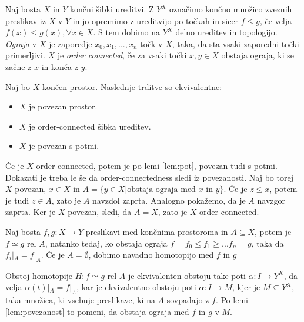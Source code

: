 \documentclass[mat1]{fmfdelo}
\begin{document}
Naj bosta $X$ in $Y$ končni šibki ureditvi. Z $Y^X$ označimo končno množico zveznih preslikav iz $X$ v $Y$ in jo opremimo z ureditvijo po točkah in sicer $f\leq g$, če velja $f(x) \leq g(x), \forall x\in X$. S tem dobimo na $Y^X$ delno ureditev in topologijo. \textit{Ograja} v $X$ je zaporedje $x_0,x_1,...,x_n$ točk v $X$, taka, da sta vsaki zaporedni točki primerljivi. $X$ je \textit{order 
connected}, če za vsaki točki $x,y\in X$ obstaja ograja, ki se začne z $x$ in konča z $y$.
\begin{lema}
    Naj bo $X$ končen prostor. Naslednje trditve so ekvivalentne:

    \begin{itemize}
        \label{lem:povezanost}
        \item $X$ je povezan prostor.
        \item $X$ je order-connected šibka ureditev.
        \item $X$ je povezan s potmi.
    \end{itemize}
\end{lema}


\begin{dokaz}
    Če je $X$ order connected, potem je po lemi \ref{lem:pot}, povezan tudi s potmi.
    Dokazati je treba le še da order-connectedness sledi iz povezanosti. Naj bo torej $X$ povezan, $x\in X$ in $A=\{y\in X| \text{obstaja ograja med $x$ in $y$}\}$. Če 
    je $z\leq x$, potem je tudi $z\in A$, zato je $A$ navzdol zaprta. Analogno pokažemo, da je $A$ navzgor zaprta. Ker je $X$ povezan, sledi, da $A=X$, zato je $X$ order connected.
\end{dokaz}

\begin{trditev}
    \label{iz:ograje}
Naj bosta $f,g: X\rightarrow Y$ preslikavi med končnima prostoroma in $A\subseteq X$, potem je $f\simeq g$ rel $A$, natanko tedaj, ko obstaja ograja $f=f_0\leq f_1\geq ... f_n=g$, taka da $f_i|_A=f|_A$. Če je $A=\emptyset$, dobimo navadno homotopijo med $f$ in $g$
\end{trditev}

\begin{dokaz}
    Obstoj homotopije $H:f\simeq g$ rel $A$ je ekvivalenten obstoju take poti $\alpha: I \rightarrow Y^X$, da velja $\alpha(t)|_A=f|_A$, kar je ekvivalentno obstoju poti 
    $\alpha: I \rightarrow M$, kjer je $M\subseteq Y^X$, taka množica, ki vsebuje preslikave, ki na $A$ sovpadajo z $f$. Po lemi \ref{lem:povezanost} to pomeni, da obstaja ograja 
    med $f$ in $g$ v $M$.
\end{dokaz}
\end{document}
